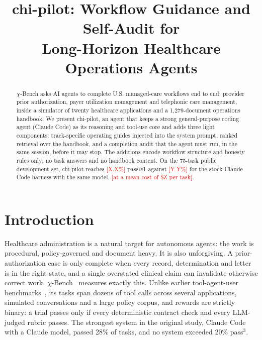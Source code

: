 \documentclass[conference]{IEEEtran}
\newcommand{\pending}[1]{\textcolor{red}{[#1]}}
\newcommand{\chib}{$\chi$-Bench}
\begin{document}
\title{chi-pilot: Workflow Guidance and Self-Audit for\\Long-Horizon Healthcare Operations Agents}

\author{
\IEEEauthorblockA{\pending{Affiliation} \\ \pending{Team name, contact e-mail}}}

\maketitle

\begin{abstract}
\chib{} asks AI agents to complete U.S. managed-care workflows end to end: provider prior
authorization, payer utilization management and telephonic care management, inside a simulator
of twenty healthcare applications and a 1,279-document operations handbook. We present
chi-pilot, an agent that keeps a strong general-purpose coding agent (Claude Code) as its
reasoning and tool-use core and adds three light components: track-specific operating guides
injected into the system prompt, ranked retrieval over the handbook, and a completion audit that
the agent must run, in the same session, before it may stop. The additions encode workflow
structure and honesty rules only; no task answers and no handbook content. On the 75-task
public development set, chi-pilot reaches \pending{X.X\%} pass@1 against \pending{Y.Y\%} for the
stock Claude Code harness with the same model, \pending{at a mean cost of \$Z per task}.
\end{abstract}

\section{Introduction}
Healthcare administration is a natural target for autonomous agents: the work is procedural,
policy-governed and document heavy. It is also unforgiving. A prior-authorization case is only
complete when every record, determination and letter is in the right state, and a single
overstated clinical claim can invalidate otherwise correct work. \chib{}~\cite{chibench}
measures exactly this. Unlike earlier tool-agent-user benchmarks~\cite{taubench}, its tasks
span dozens of tool calls across several applications, simulated conversations and a large
policy corpus, and rewards are strictly binary: a trial passes only if every deterministic
contract check and every LLM-judged rubric passes. The strongest system in the original study,
Claude Code with a Claude model, passed 28\% of tasks, and no system exceeded 20\% pass$^3$.
\end{document}
